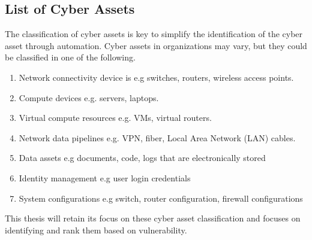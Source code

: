 \subsection{List of Cyber Assets}\label{sec:assets}
The classification of cyber assets is key to simplify the identification of the cyber asset through automation. Cyber assets in organizations may vary, but they could be classified in one of the following.
\begin{enumerate}\label{ref:cyber_assets}
                \item Network connectivity device is e.g switches, routers, wireless access points.
                \item Compute devices e.g. servers, laptops.
                \item Virtual compute resources e.g. VMs, virtual routers.
                \item Network data pipelines e.g. VPN, fiber, Local Area Network (LAN) cables.
                \item Data assets e.g documents, code, logs that are electronically stored
                \item Identity management e.g user login credentials
                \item System configurations e.g switch, router configuration, firewall configurations
\end{enumerate}

This thesis will retain its focus on these cyber asset classification and focuses on identifying and rank them based on vulnerability.


